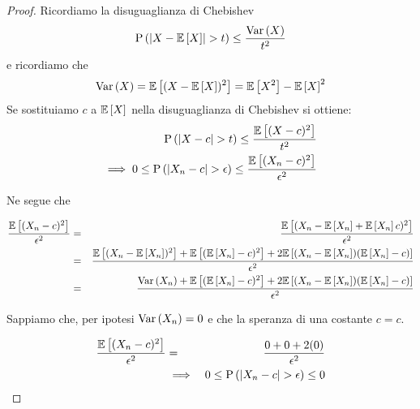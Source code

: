 \begin{defn}
    \begin{proof}
        Ricordiamo la disuguaglianza di Chebishev
        \begin{equation*}
            \begin{aligned}
                \text{P}\left(\lvert X - \mathbb{E}\left[X\right]\rvert > t\right) \leq \frac{\text{Var}\left(X\right)}{t^2}
            \end{aligned}
        \end{equation*}
        e ricordiamo che
        \begin{equation*}
            \begin{aligned}
                \text{Var}\left(X\right) = \mathbb{E}\left[(X - \mathbb{E}\left[X\right])^2\right] = \mathbb{E}\left[X^2\right] - \mathbb{E}\left[X\right]^2
            \end{aligned}
        \end{equation*}
        Se sostituiamo $c$ a $\mathbb{E}\left[X\right]$ nella disuguaglianza di Chebishev si
        ottiene:
        \begin{equation*}
            \begin{aligned}
                \text{P}\left(\lvert X - c\rvert > t\right) \leq \frac{\mathbb{E}\left[(X - c)^2\right]}{t^2} \\
                \implies 0 \leq \text{P}\left(\lvert X_n - c\rvert > \epsilon\right) \leq \frac{\mathbb{E}\left[(X_n - c)^2\right]}{\epsilon^2} \\
            \end{aligned}
        \end{equation*}

        Ne segue che

        \begin{eqnarray*}
            \frac{\mathbb{E}\left[(X_n - c)^2\right]}{\epsilon^2} &=& \frac{\mathbb{E}\left[(X_n - \mathbb{E}\left[X_n\right] + \mathbb{E}\left[X_n\right] c)^2\right]}{\epsilon^2} \\
                &=& \dfrac{\mathbb{E}\left[(X_n - \mathbb{E}\left[X_n\right])^2\right] + \mathbb{E}\left[(\mathbb{E}\left[X_n\right] -c)^2\right] + 2 \mathbb{E}\left[(X_n - \mathbb{E}\left[X_n\right])(\mathbb{E}\left[X_n\right] - c)\right]}{\epsilon^2} \\
                &=& \frac{\text{Var}\left(X_n\right) + \mathbb{E}\left[(\mathbb{E}\left[X_n\right] -c)^2\right] + 2 \mathbb{E}\left[(X_n - \mathbb{E}\left[X_n\right])(\mathbb{E}\left[X_n\right] - c)\right]}{\epsilon^2}
        \end{eqnarray*}

        Sappiamo che, per ipotesi $\text{Var}\left(X_n\right) = 0$ e che la speranza di una
        costante $ c = c $.


        \begin{eqnarray*}
            \frac{\mathbb{E}\left[(X_n - c)^2\right]}{\epsilon^2} &=& \dfrac{0 + 0 + 2(0)}{\epsilon^2} \\
            &\implies& 0 \leq \text{P}\left(\lvert X_n - c\rvert > \epsilon\right) \leq 0
        \end{eqnarray*}

    \end{proof}

\end{defn}


